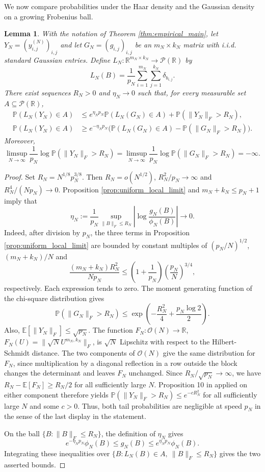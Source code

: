 \documentclass[11pt,a4paper,twoside]{article}
\renewcommand{\P}{\mathbb P}
\newcommand{\E}{\mathbb E}
\newcommand{\R}{\mathbb R}
\renewcommand{\O}{\mathcal O}
\newtheorem{lemma}[thm]{Lemma}
\theoremstyle{definition}
\begin{document}
		We now compare probabilities under the Haar density and the Gaussian density on a growing Frobenius ball.

		\begin{lemma}\label{lem:density_comparison}
			With the notation of Theorem \ref{thm:empirical_main}, let $Y_N=(y_{i,j}^{(N)})_{i,j}$ and let $G_N=(g_{i,j})_{i,j}$ be an $m_N\times k_N$ matrix with i.i.d. standard Gaussian entries. Define $L_N \colon \R^{m_N\times k_N}\to\mathcal P(\R)$ by
			$$
			L_N(B)=\frac{1}{p_N}\sum_{i=1}^{m_N}\sum_{j=1}^{k_N}\delta_{b_{i,j}}.
			$$
			There exist sequences $R_N>0$ and $\eta_N\to0$ such that, for every measurable set $A\subseteq\mathcal P(\R)$,
			\begin{align*}
			\P(L_N(Y_N)\in A)&\le e^{\eta_Np_N}\P(L_N(G_N)\in A)+\P(\|Y_N\|_F>R_N),\\
			\P(L_N(Y_N)\in A)&\ge e^{-\eta_Np_N}\bigl(\P(L_N(G_N)\in A)-\P(\|G_N\|_F>R_N)\bigr).
			\end{align*}
			Moreover,
			$$
			\limsup_{N\to\infty}\frac{1}{p_N}\log\P(\|Y_N\|_F>R_N)
			=
			\limsup_{N\to\infty}\frac{1}{p_N}\log\P(\|G_N\|_F>R_N)
			=-\infty.
			$$
		\end{lemma}

		\begin{proof}
			Set $R_N=N^{1/8}p_N^{3/8}$. Then $R_N=o(N^{1/2})$, $R_N^2/p_N\to\infty$ and $R_N^4/(Np_N)\to0$. Proposition \ref{prop:uniform_local_limit} and $m_N+k_N\le p_N+1$ imply that
			$$
			\eta_N:=\frac{1}{p_N}\sup_{\|B\|_F\le R_N}\left|\log\frac{g_N(B)}{\phi_N(B)}\right|\longrightarrow0.
			$$
			Indeed, after division by $p_N$, the three terms in Proposition \ref{prop:uniform_local_limit} are bounded by constant multiples of $(p_N/N)^{1/2}$, $(m_N+k_N)/N$ and
			$$
			\frac{(m_N+k_N)R_N^2}{Np_N}\le \left(1+\frac{1}{p_N}\right)\left(\frac{p_N}{N}\right)^{3/4},
			$$
			respectively. Each expression tends to zero.
			The moment generating function of the chi-square distribution gives
			$$
			\P(\|G_N\|_F>R_N)\le \exp\left(-\frac{R_N^2}{4}+\frac{p_N\log2}{2}\right).
			$$
			Also, $\E[\|Y_N\|_F]\le\sqrt{p_N}$. The function $F_N \colon \O(N)\to\R$, $F_N(U)=\|\sqrt{N}U^{m_N,k_N}\|_F$, is $\sqrt{N}$ Lipschitz with respect to the Hilbert-Schmidt distance. The two components of $\O(N)$ give the same distribution for $F_N$, since multiplication by a diagonal reflection in a row outside the block changes the determinant and leaves $F_N$ unchanged. Since $R_N/\sqrt{p_N}\to\infty$, we have $R_N-\E[F_N]\ge R_N/2$ for all sufficiently large $N$. Proposition 10 in \cite{meckes2017rates} applied on either component therefore yields $\P(\|Y_N\|_F>R_N)\le e^{-cR_N^2}$ for all sufficiently large $N$ and some $c>0$. Thus, both tail probabilities are negligible at speed $p_N$ in the sense of the last display in the statement.

			On the ball $\{B:\|B\|_F\le R_N\}$, the definition of $\eta_N$ gives
			$$
			e^{-\eta_Np_N}\phi_N(B)\le g_N(B)\le e^{\eta_Np_N}\phi_N(B).
			$$
			Integrating these inequalities over $\{B:L_N(B)\in A,\ \|B\|_F\le R_N\}$ gives the two asserted bounds.
		\end{proof}
\end{document}
